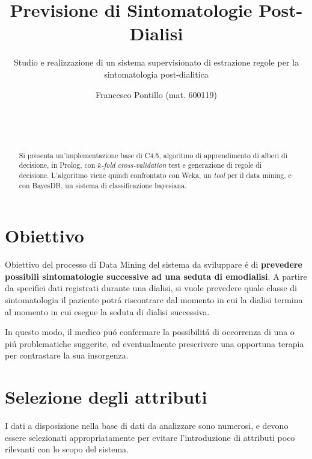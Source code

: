\documentclass[preprint]{acm_proc_article-sp}
\begin{document}
\title{Previsione di Sintomatologie Post-Dialisi}
\subtitle{Studio e realizzazione di un sistema supervisionato di estrazione regole per la sintomatologia post-dialitica}

\author{
	\alignauthor
	Francesco Pontillo (mat. 600119)\\
       \\
       \\
       \\
}

\maketitle

\begin{abstract}
Si presenta un'implementazione base di C4.5, algoritmo di apprendimento di alberi di decisione, in Prolog, con $k$\textit{-fold cross-validation} test e generazione di regole di decisione. L'algoritmo viene quindi confrontato con Weka, un \textit{tool} per il data mining, e con BayesDB, un sistema di classificazione bayesiana.
\end{abstract}

\section{Obiettivo}
Obiettivo del processo di Data Mining del sistema da sviluppare \'e di \textbf{prevedere possibili sintomatologie successive ad una seduta di emodialisi}.
A partire da specifici dati registrati durante una dialisi, si vuole prevedere quale classe di sintomatologia il paziente potr\'a riscontrare dal momento in cui la dialisi termina al momento in cui esegue la seduta di dialisi successiva.

In questo modo, il medico pu\'o confermare la possibilit\'a di occorrenza di una o pi\'u problematiche suggerite, ed eventualmente prescrivere una opportuna terapia per contrastare la sua insorgenza.

\section{Selezione degli attributi}
I dati a disposizione nella base di dati da analizzare sono numerosi, e devono essere selezionati appropriatamente per evitare l'introduzione di attributi poco rilevanti con lo scopo del sistema.
\end{document}
